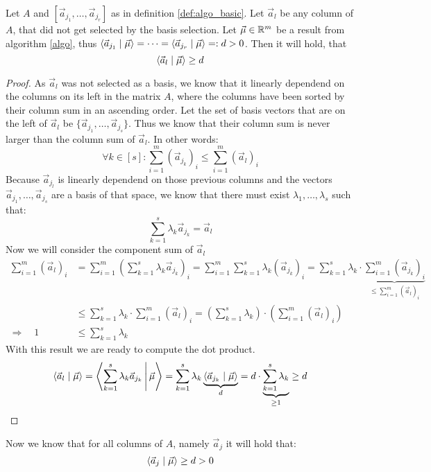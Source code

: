 \begin{lemma}
    \label{lemma:non_basis_vecs_greater}
    Let $A$ and $[\vec a_{j_1}, \dots, \vec a_{j_r}]$ as in definition \ref{def:algo_basic}. Let $\vec a_l$ be any column of $A$, that did not get selected by the basis selection. Let $\vec\mu \in \mathbb{R}^m$ be a result from algorithm \ref{algo}, thus $\langle \vec a_{j_1} \mid \vec\mu \rangle = \dots = \langle \vec a_{j_r} \mid \vec\mu \rangle =: d > 0$. Then it will hold, that 
    $$\langle \vec a_l \mid \vec\mu \rangle \geq d$$
\end{lemma}
\begin{proof}
    As $\vec a_l$ was not selected as a basis, we know that it linearly dependend on the columns on its left in the matrix $A$, where the columns have been sorted by their column sum in an ascending order.  Let the set of basis vectors that are on the left of $\vec a_l$ be $\{\vec a_{j_1}, \dots, \vec a_{j_s}\}$. Thus we know that their column sum is never larger than the column sum of $\vec a_l$. In other words:
    $$\forall k \in [s]\colon\sum_{i=1}^{m} \left(\vec a_{j_k}\right)_i \leq \sum_{i=1}^{m} \left(\vec a_l\right)_i$$
    Because $\vec a_{j_l}$ is linearly dependend on those previous columns and the vectors $\vec a_{j_1}, \dots, \vec a_{j_s}$ are a basis of that space, we know that there must exist $\lambda_1, \dots, \lambda_s$ such that:
    $$\sum_{k=1}^{s}\lambda_k \vec a_{j_k} = \vec a_l$$
    Now we will consider the component sum of $\vec a_l$
    \begin{align*}
        \sum_{i=1}^{m} (\vec a_l)_i &= \sum_{i=1}^{m} \left(\sum_{k=1}^{s}\lambda_k \vec a_{j_k}\right)_i = \sum_{i=1}^{m} \sum_{k=1}^{s}\lambda_k \left(\vec a_{j_k}\right)_i = \sum_{k=1}^{s} \lambda_k \cdot\underbrace{\sum_{i=1}^{m} \left(\vec a_{j_k}\right)_i}_{\leq \sum_{i=1}^{m} (\vec a_l)_i}\\
        &\leq \sum_{k=1}^{s} \lambda_k \cdot\sum_{i=1}^{m} (\vec a_l)_i = \left(\sum_{k=1}^{s} \lambda_k\right) \cdot\left(\sum_{i=1}^{m} (\vec a_l)_i\right)\\
        \Rightarrow\quad 1 &\leq \sum_{k=1}^{s} \lambda_k
    \end{align*}
    With this result we are ready to compute the dot product.
    $$\langle \vec a_{l} \mid \vec\mu \rangle = \left\langle \sum_{k=1}^{s}\lambda_k \vec a_{j_k} \,\middle|\, \vec\mu \right\rangle = \sum_{k=1}^{s}\lambda_k \underbrace{\langle \vec a_{j_k} \mid \vec\mu \rangle}_d = d\cdot \underbrace{\sum_{k=1}^{s}\lambda_k}_{\geq 1} \geq d$$
\end{proof}
Now we know that for all columns of $A$, namely $\vec a_j$ it will hold that:
$$\langle \vec a_j \mid \vec\mu \rangle \geq d > 0$$

